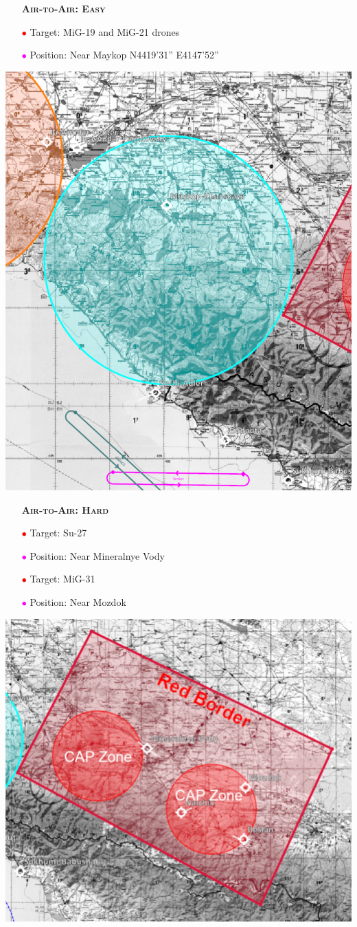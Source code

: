 \documentclass[a4paper,12pt,dvipsnames]{letter}
\newcommand{\Deg}{\textdegree{}}
\newcommand{\DMS}[3]{#1\Deg#2'#3''}
\newcommand{\myHead}[1]{{\LARGE\textsc{\textbf{#1}}}}
\newcommand{\ri}{\textcolor{Red}{$\bullet$\;}}
\newcommand{\mi}{\textcolor{Magenta}{$\bullet$\;}}
\begin{document}
{%
\newpage
\begin{itemize}
 \item[] \myHead{Air-to-Air: Easy}
 \item[\ri] Target: MiG-19 and MiG-21 drones
 \item[\mi] Position: Near Maykop N\DMS{44}{19}{31} E\DMS{41}{47}{52}
\end{itemize}
\begin{center}
 \includegraphics[width=0.7\linewidth]{../gimp/A2A_Drones.png}
\end{center}
%
\newpage
\begin{itemize}
 \item[] \myHead{Air-to-Air: Hard}
 \item[\ri] Target: Su-27
 \item[\mi] Position: Near Mineralnye Vody
 \item[\ri] Target: MiG-31
 \item[\mi] Position: Near Mozdok
\end{itemize}
\begin{center}
 \includegraphics[width=0.7\linewidth]{../gimp/A2A_Border.png}

\end{center}}
\end{document}
